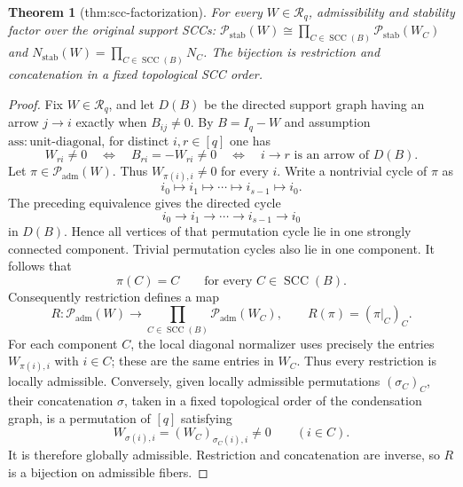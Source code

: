 \documentclass{article}
\newtheorem{theorem}{Theorem}
\begin{document}
\begin{theorem}[thm:scc-factorization]\label{thm:scc-factorization}
For every \(W\in\mathcal R_q\), admissibility and stability factor over the original support SCCs: \(\mathcal P_{\mathrm{stab}}(W)\cong\prod_{C\in\operatorname{SCC}(B)}\mathcal P_{\mathrm{stab}}(W_C)\) and \(N_{\mathrm{stab}}(W)=\prod_{C\in\operatorname{SCC}(B)}N_C\). The bijection is restriction and concatenation in a fixed topological SCC order.
\end{theorem}
\begin{proof}
Fix \(W\in\mathcal R_q\), and let \(D(B)\) be the directed support graph having an arrow \(j\to i\) exactly when \(B_{ij}\neq 0\). By \(B=I_q-W\) and assumption \(\mathrm{ass:unit\mbox{-}diagonal}\), for distinct \(i,r\in[q]\) one has
\[
 W_{ri}\neq 0
 \quad\Longleftrightarrow\quad
 B_{ri}=-W_{ri}\neq 0
 \quad\Longleftrightarrow\quad
 i\to r\text{ is an arrow of }D(B).
\]
Let \(\pi\in\mathcal P_{\mathrm{adm}}(W)\). Thus \(W_{\pi(i),i}\neq0\) for every \(i\). Write a nontrivial cycle of \(\pi\) as
\[
 i_0\mapsto i_1\mapsto\cdots\mapsto i_{s-1}\mapsto i_0.
\]
The preceding equivalence gives the directed cycle
\[
 i_0\to i_1\to\cdots\to i_{s-1}\to i_0
\]
in \(D(B)\). Hence all vertices of that permutation cycle lie in one strongly connected component. Trivial permutation cycles also lie in one component. It follows that
\[
 \pi(C)=C\qquad\text{for every }C\in\operatorname{SCC}(B).
\]
Consequently restriction defines a map
\[
 R:\mathcal P_{\mathrm{adm}}(W)
 \longrightarrow
 \prod_{C\in\operatorname{SCC}(B)}\mathcal P_{\mathrm{adm}}(W_C),
 \qquad
 R(\pi)=(\pi|_C)_C.
\]
For each component \(C\), the local diagonal normalizer uses precisely the entries \(W_{\pi(i),i}\) with \(i\in C\); these are the same entries in \(W_C\). Thus every restriction is locally admissible. Conversely, given locally admissible permutations \((\sigma_C)_C\), their concatenation \(\sigma\), taken in a fixed topological order of the condensation graph, is a permutation of \([q]\) satisfying
\[
 W_{\sigma(i),i}=(W_C)_{\sigma_C(i),i}\neq0
 \qquad(i\in C).
\]
It is therefore globally admissible. Restriction and concatenation are inverse, so \(R\) is a bijection on admissible fibers.


\end{proof}
\end{document}
